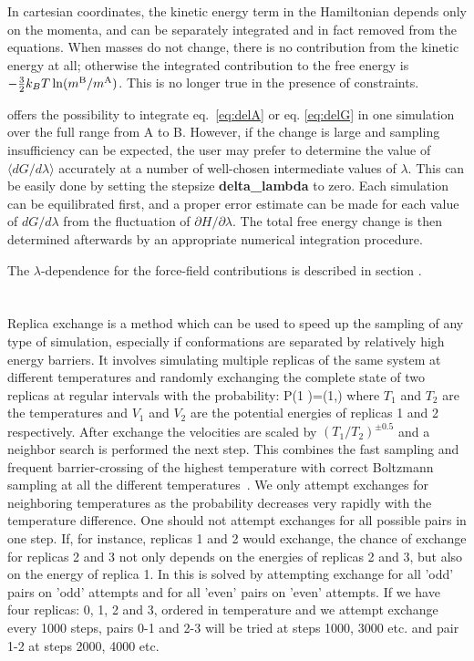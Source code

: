 In cartesian coordinates, the kinetic energy term in the Hamiltonian
depends only on the momenta, and can be separately integrated and in
fact removed from the equations. When masses do not change, there is
no contribution from the kinetic energy at all; otherwise the
integrated contribution to the free energy is $-\frac{3}{2} k_BT \ln
(m^{\mathrm{B}}/m^{\mathrm{A}})$. This is no longer true in the presence of constraints.
  
{\gromacs} offers the possibility to integrate eq.~\ref{eq:delA} or
eq. \ref{eq:delG} in one simulation over the full range from A to
B. However, if the change is large and sampling insufficiency can be
expected, the user may prefer to determine the value of $\langle
dG/d\lambda \rangle$ accurately at a number of well-chosen
intermediate values of $\lambda$. This can be easily done by setting
the stepsize \textbf{delta\_lambda} to zero. Each simulation can be
equilibrated first, and a proper error estimate can be made for each
value of $dG/d\lambda$ from the fluctuation of $\partial H/\partial
\lambda$. The total free energy change is then determined afterwards
by an appropriate numerical integration procedure.

The $\lambda$-dependence for the force-field contributions is
described in section .

\section{}
Replica exchange is a method which can be used to speed up
the sampling of any type of simulation, especially if
conformations are separated by relatively high energy barriers.
It involves simulating multiple replicas of the same system
at different temperatures and randomly exchanging the complete state
of two replicas at regular intervals with the probability:
\beq
P(1 )=\min\left(1,\exp{} \right)
\eeq
where $T_1$ and $T_2$ are the temperatures and $V_1$ and $V_2$
are the potential energies of replicas 1 and 2 respectively.
After exchange the velocities are scaled by $(T_1/T_2)^{\pm0.5}$
and a neighbor search is performed the next step.
This combines the fast sampling and frequent barrier-crossing
of the highest temperature with correct Boltzmann sampling at
all the different temperatures~\cite{Sugita99}.
We only attempt exchanges for neighboring temperatures as the probability
decreases very rapidly with the temperature difference.
One should not attempt exchanges for all possible pairs in one step.
If, for instance, replicas 1 and 2 would exchange, the chance of
exchange for replicas 2 and 3 not only depends on the energies of
replicas 2 and 3, but also on the energy of replica 1.
In {\gromacs} this is solved by attempting exchange for all 'odd'
pairs on 'odd' attempts and for all 'even' pairs on 'even' attempts.
If we have four replicas: 0, 1, 2 and 3, ordered in temperature
and we attempt exchange every 1000 steps, pairs 0-1 and 2-3
will be tried at steps 1000, 3000 etc. and pair 1-2 at steps 2000, 4000 etc.

